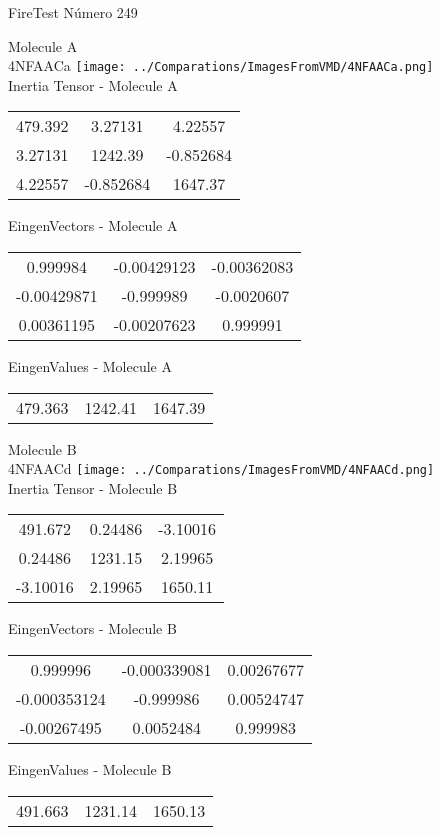 \vtab[-2cm]
\begin{center}
{\large FireTest \tab Número 249}
\end{center}
\begin{multicols}{2}
\begin{center}

Molecule A \\ 
4NFAACa
\texttt{[image: ../Comparations/ImagesFromVMD/4NFAACa.png]}
\\
Inertia Tensor - Molecule A \\
\vtab

\begin{tabular}{|c c c|}
479.392	 & 	3.27131	 & 	4.22557	 \\
3.27131	 & 	1242.39	 & 	-0.852684	 \\
4.22557	 & 	-0.852684	 & 	1647.37
\end{tabular}

\vtab
 EingenVectors - Molecule A     \\
\vtab
\begin{tabular}{|c c c|}
0.999984	 & 	-0.00429123	 & 	-0.00362083	 \\
-0.00429871	 & 	-0.999989	 & 	-0.0020607	 \\
0.00361195	 & 	-0.00207623	 & 	0.999991
\end{tabular}

\vtab
 EingenValues - Molecule A     \\
\vtab
\begin{tabular}{|c c c|}
479.363	 & 	1242.41	 & 	1647.39	 \\
\end{tabular}
\columnbreak

Molecule B \\ 
4NFAACd
\texttt{[image: ../Comparations/ImagesFromVMD/4NFAACd.png]}
\\
Inertia Tensor - Molecule B \\
\vtab

\begin{tabular}{|c c c|}
491.672	 & 	0.24486	 & 	-3.10016	 \\
0.24486	 & 	1231.15	 & 	2.19965	 \\
-3.10016	 & 	2.19965	 & 	1650.11
\end{tabular}

\vtab
 EingenVectors - Molecule B     \\
\vtab
\begin{tabular}{|c c c|}
0.999996	 & 	-0.000339081	 & 	0.00267677	 \\
-0.000353124	 & 	-0.999986	 & 	0.00524747	 \\
-0.00267495	 & 	0.0052484	 & 	0.999983
\end{tabular}

\vtab
 EingenValues - Molecule B     \\
\vtab
\begin{tabular}{|c c c|}
491.663	 & 	1231.14	 & 	1650.13	 \\
\end{tabular}

\end{center}
\end{multicols}
